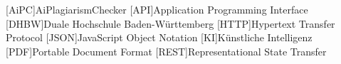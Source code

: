\addchap*{\langacronyms}
\begin{acronym}
  [AiPC]{AiPlagiarismChecker}
  [API]{Application Programming Interface}
  [DHBW]{Duale Hochschule Ba\-den-\-Würt\-tem\-berg}
  [HTTP]{Hypertext Transfer Protocol}
  [JSON]{JavaScript Object Notation}
  [KI]{Künstliche Intelligenz}
  [PDF]{Portable Document Format}
  [REST]{Representational State Transfer}
\end{acronym}